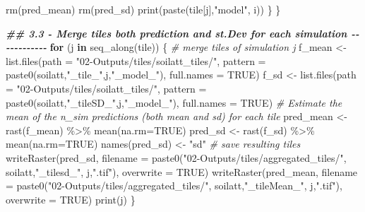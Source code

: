 \documentclass[
  10pt,
  b5paper,
  oneside]{book}
\newenvironment{Shaded}{\begin{snugshade}}{\end{snugshade}}
\newcommand{\AttributeTok}[1]{\textcolor[rgb]{0.77,0.63,0.00}{#1}}
\newcommand{\CommentTok}[1]{\textcolor[rgb]{0.56,0.35,0.01}{\textit{#1}}}
\newcommand{\ConstantTok}[1]{\textcolor[rgb]{0.00,0.00,0.00}{#1}}
\newcommand{\ControlFlowTok}[1]{\textcolor[rgb]{0.13,0.29,0.53}{\textbf{#1}}}
\newcommand{\DocumentationTok}[1]{\textcolor[rgb]{0.56,0.35,0.01}{\textbf{\textit{#1}}}}
\newcommand{\FunctionTok}[1]{\textcolor[rgb]{0.00,0.00,0.00}{#1}}
\newcommand{\NormalTok}[1]{#1}
\newcommand{\OtherTok}[1]{\textcolor[rgb]{0.56,0.35,0.01}{#1}}
\newcommand{\SpecialCharTok}[1]{\textcolor[rgb]{0.00,0.00,0.00}{#1}}
\newcommand{\StringTok}[1]{\textcolor[rgb]{0.31,0.60,0.02}{#1}}
\begin{document}
\begin{Shaded}
\begin{Highlighting}[]
    \FunctionTok{rm}\NormalTok{(pred\_mean)}
    \FunctionTok{rm}\NormalTok{(pred\_sd)}
    \FunctionTok{print}\NormalTok{(}\FunctionTok{paste}\NormalTok{(tile[j],}\StringTok{"model"}\NormalTok{, i))}
\NormalTok{  \}}
\NormalTok{\}}

\DocumentationTok{\#\# 3.3 {-} Merge tiles both prediction and st.Dev for each simulation {-}{-}{-}{-}{-}{-}{-}{-}{-}{-}{-}{-}}
\ControlFlowTok{for}\NormalTok{ (j }\ControlFlowTok{in} \FunctionTok{seq\_along}\NormalTok{(tile)) \{}
  \CommentTok{\# merge tiles of simulation j}
\NormalTok{  f\_mean }\OtherTok{\textless{}{-}} \FunctionTok{list.files}\NormalTok{(}\AttributeTok{path =} \StringTok{"02{-}Outputs/tiles/soilatt\_tiles/"}\NormalTok{, }
                       \AttributeTok{pattern =} \FunctionTok{paste0}\NormalTok{(soilatt,}\StringTok{"\_tile\_"}\NormalTok{,j,}\StringTok{"\_model\_"}\NormalTok{), }
                       \AttributeTok{full.names =} \ConstantTok{TRUE}\NormalTok{)}
\NormalTok{  f\_sd }\OtherTok{\textless{}{-}} \FunctionTok{list.files}\NormalTok{(}\AttributeTok{path =} \StringTok{"02{-}Outputs/tiles/soilatt\_tiles/"}\NormalTok{, }
                     \AttributeTok{pattern =}  \FunctionTok{paste0}\NormalTok{(soilatt,}\StringTok{"\_tileSD\_"}\NormalTok{,j,}\StringTok{"\_model\_"}\NormalTok{), }
                     \AttributeTok{full.names =} \ConstantTok{TRUE}\NormalTok{)}
  \CommentTok{\# Estimate the mean of the n\_sim predictions (both mean and sd) for each tile}
\NormalTok{  pred\_mean }\OtherTok{\textless{}{-}} \FunctionTok{rast}\NormalTok{(f\_mean) }\SpecialCharTok{\%\textgreater{}\%} \FunctionTok{mean}\NormalTok{(}\AttributeTok{na.rm=}\ConstantTok{TRUE}\NormalTok{)}
\NormalTok{  pred\_sd }\OtherTok{\textless{}{-}} \FunctionTok{rast}\NormalTok{(f\_sd) }\SpecialCharTok{\%\textgreater{}\%} \FunctionTok{mean}\NormalTok{(}\AttributeTok{na.rm=}\ConstantTok{TRUE}\NormalTok{)}
  \FunctionTok{names}\NormalTok{(pred\_sd) }\OtherTok{\textless{}{-}} \StringTok{"sd"}
  \CommentTok{\# save resulting tiles}
  \FunctionTok{writeRaster}\NormalTok{(pred\_sd, }
              \AttributeTok{filename =} \FunctionTok{paste0}\NormalTok{(}\StringTok{"02{-}Outputs/tiles/aggregated\_tiles/"}\NormalTok{,}
\NormalTok{                                soilatt,}\StringTok{"\_tilesd\_"}\NormalTok{, j,}\StringTok{".tif"}\NormalTok{), }
              \AttributeTok{overwrite =} \ConstantTok{TRUE}\NormalTok{)}
  \FunctionTok{writeRaster}\NormalTok{(pred\_mean, }
              \AttributeTok{filename =} \FunctionTok{paste0}\NormalTok{(}\StringTok{"02{-}Outputs/tiles/aggregated\_tiles/"}\NormalTok{,}
\NormalTok{                                soilatt,}\StringTok{"\_tileMean\_"}\NormalTok{, j,}\StringTok{".tif"}\NormalTok{), }
              \AttributeTok{overwrite =} \ConstantTok{TRUE}\NormalTok{)}
  \FunctionTok{print}\NormalTok{(j)}
\NormalTok{\}}


\end{Highlighting}
\end{Shaded}
\end{document}
